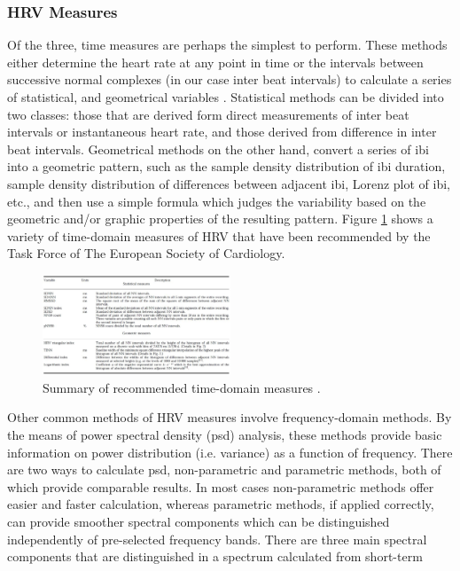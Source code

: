 \subsubsection{HRV Measures}
Of the three, time measures are perhaps the simplest to perform. These methods either determine the heart rate at any point in time or the intervals between successive normal complexes (in our case inter beat intervals) to calculate a series of statistical, and geometrical variables \cite{TheEuropeanSocietyofCardiology1996}. 
Statistical methods can be divided into two classes: those that are derived form direct measurements of inter beat intervals or instantaneous heart rate, and those derived from difference in inter beat intervals. Geometrical methods on the other hand, convert a series of \gls{ibi} into a geometric pattern, such as the sample density distribution
of \gls{ibi} duration, sample density distribution of differences between adjacent \gls{ibi}, Lorenz plot of \gls{ibi}, etc., and then use a simple
formula which judges the variability based on the geometric and/or graphic properties of the resulting pattern\cite{TheEuropeanSocietyofCardiology1996}. Figure \ref{tdf} shows a variety of time-domain measures of HRV that have been recommended by the Task Force of The European Society of Cardiology.
\begin{figure}[ht]
	\centering
  \includegraphics[width=0.5\textwidth, angle=0]{images/SelectedTimeDomainMeasures.jpg}
	\caption[Selected time-domain measures of HRV]{Summary of recommended time-domain measures \cite{TheEuropeanSocietyofCardiology1996}. }
	\label{tdf}
\end{figure}
Other common methods of HRV measures involve frequency-domain methods. By the means of power spectral density (\gls{psd}) analysis, these methods provide basic information on power distribution (i.e. variance) as a function of frequency. There are two ways to calculate \gls{psd}, non-parametric and parametric methods, both of which provide comparable results. In most cases non-parametric methods offer easier and faster calculation, whereas parametric methods, if applied correctly, can provide smoother spectral components which can be distinguished independently of pre-selected frequency bands. There are three main spectral components that are distinguished in a spectrum calculated from short-term
